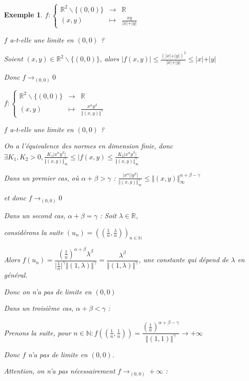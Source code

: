 \documentclass[a4paper,12pt]{book}
\newtheorem{Exe}{Exemple}[section]
\def\R{\mathbb{R}}
\def\N{\mathbb{N}}
\begin{document}
\begin{Exe}
$f:\left\{\begin{array}{rcl} \R^2\backslash\{(0,0)\} & \to & \R \\ (x,y) & \mapsto & \frac{xy}{\vert x\vert+\vert y\vert} \end{array}\right.$
\par $f$ a-t-elle une limite en $(0,0)$ ? \par Soient $(x,y)\in\R^2\backslash\{(0,0)\}$, alors $\vert f(x,y)\vert\leq \frac{(\vert x\vert + \vert y\vert)^2}{\vert x\vert + \vert y\vert}\leq \vert x\vert+\vert y\vert$ \par Donc $f\to_{(0,0)}0$
\par $f:\left\{\begin{array}{rcl} \R^2\backslash\{(0,0)\} & \to & \R \\ (x,y) & \mapsto & \frac{x^\alpha y^\beta}{\Vert(x,y)\Vert^\gamma} \end{array}\right.$
\par $f$ a-t-elle une limite en $(0,0)$ ? \par On a l'équivalence des normes en dimension finie, donc $\exists K_1,K_2>0, \frac{K_1\vert x^\alpha y^\beta\vert}{\Vert(x,y)\Vert_\infty^\gamma}\leq\vert f(x,y)\leq\frac{K_2 \vert x^\alpha y^\beta\vert}{\Vert(x,y)\Vert_\infty^\gamma}$ \par Dans un premier cas, où $\alpha+\beta>\gamma$ : $\frac{\vert x^\alpha\vert\vert y^\beta\vert}{\Vert(x,y)\Vert_\infty^\gamma}\leq\Vert(x,y)\Vert_\infty^{\alpha+\beta-\gamma}$ \par et donc $f\to_{(0,0)}0$
\par Dans un second cas, $\alpha+\beta=\gamma$ : Soit $\lambda\in\R$, \par considérons la suite $(u_n)=((\frac{1}{n},\frac{\lambda}{n}))_{n\in\N}$ \par Alors $f(u_n)=\dfrac{(\frac{1}{n})^{\alpha+\beta}\lambda^\beta}{\vert\frac{1}{n}\vert^\gamma\Vert(1,\lambda)\Vert^\gamma} = \dfrac{\lambda^\beta}{\Vert(1,\lambda)\Vert^\gamma}$, une constante qui dépend de $\lambda$ en général. \par Donc on n'a pas de limite en $(0,0)$ 
\par Dans un troisième cas, $\alpha+\beta<\gamma$ : \par Prenons la suite, pour $n\in\N : f\left(\left(\frac{1}{n},\frac{1}{n}\right)\right)=\dfrac{(\frac{1}{n})^{\alpha+\beta-\gamma}}{\Vert(1, 1)\Vert^\gamma}\to+\infty$ \par Donc $f$ n'a pas de limite en $(0,0)$. \par Attention, on n'a pas nécessairement $f\to_{(0,0)}+\infty$ :

\end{Exe}
\end{document}
